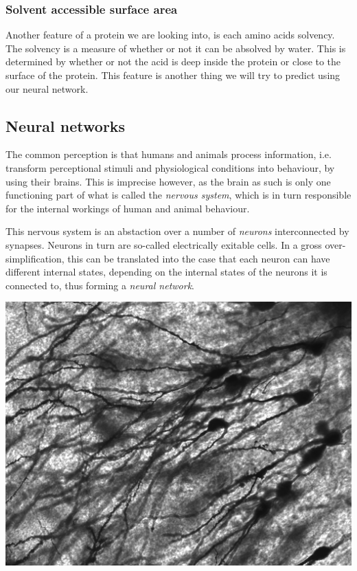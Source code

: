 \subsubsection{Solvent accessible surface area}
Another feature of a protein we are looking into, is each amino acids solvency. The solvency is a measure of whether or not it can be absolved by water. This is determined by whether or not the acid is deep inside the protein or close to the surface of the protein. This feature is another thing we will try to predict using our neural network. 

\subsection{Neural networks}
The common perception is that humans and animals process information, i.e. transform perceptional 
stimuli and physiological conditions into behaviour, by using their brains. This is imprecise 
however, as the brain as such is only one functioning part of what is called the \textit{nervous 
system}, which is in turn responsible for the internal workings of human and animal behaviour.

This nervous system is an abstaction over a number of \textit{neurons} interconnected by 
synapses. Neurons in turn are so-called electrically exitable cells. In a gross over-simplification, this can be translated into the case that each neuron can have different internal states, depending on the internal states of the neurons it is connected to, thus forming a \textit{neural network}.


\begin{Figure}
 \centering
 \includegraphics[width=0.8\linewidth]{images/Gyrus_Dentatus_40x}
 \captionsetup{width=0.8\linewidth, font=small}
\end{Figure}

